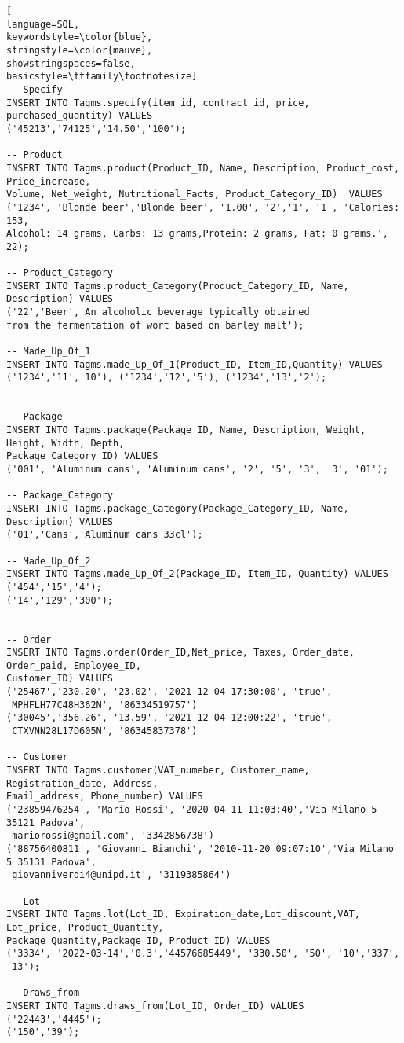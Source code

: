 \begin{lstlisting}[
language=SQL,
keywordstyle=\color{blue},
stringstyle=\color{mauve},
showstringspaces=false,
basicstyle=\ttfamily\footnotesize]
-- Specify
INSERT INTO Tagms.specify(item_id, contract_id, price, purchased_quantity) VALUES
('45213','74125','14.50','100');

-- Product
INSERT INTO Tagms.product(Product_ID, Name, Description, Product_cost, Price_increase,
Volume, Net_weight, Nutritional_Facts, Product_Category_ID)  VALUES 
('1234', 'Blonde beer','Blonde beer', '1.00', '2','1', '1', 'Calories: 153, 
Alcohol: 14 grams, Carbs: 13 grams,Protein: 2 grams, Fat: 0 grams.', 22);

-- Product_Category
INSERT INTO Tagms.product_Category(Product_Category_ID, Name, Description) VALUES 
('22','Beer','An alcoholic beverage typically obtained 
from the fermentation of wort based on barley malt');

-- Made_Up_Of_1
INSERT INTO Tagms.made_Up_Of_1(Product_ID, Item_ID,Quantity) VALUES
('1234','11','10'), ('1234','12','5'), ('1234','13','2');


-- Package
INSERT INTO Tagms.package(Package_ID, Name, Description, Weight, Height, Width, Depth, 
Package_Category_ID) VALUES
('001', 'Aluminum cans', 'Aluminum cans', '2', '5', '3', '3', '01');

-- Package_Category
INSERT INTO Tagms.package_Category(Package_Category_ID, Name, Description) VALUES 
('01','Cans','Aluminum cans 33cl');

-- Made_Up_Of_2
INSERT INTO Tagms.made_Up_Of_2(Package_ID, Item_ID, Quantity) VALUES
('454','15','4');
('14','129','300');


-- Order
INSERT INTO Tagms.order(Order_ID,Net_price, Taxes, Order_date, Order_paid, Employee_ID, 
Customer_ID) VALUES 
('25467','230.20', '23.02', '2021-12-04 17:30:00', 'true', 'MPHFLH77C48H362N', '86334519757')
('30045','356.26', '13.59', '2021-12-04 12:00:22', 'true', 'CTXVNN28L17D605N', '86345837378')

-- Customer
INSERT INTO Tagms.customer(VAT_numeber, Customer_name, Registration_date, Address, 
Email_address, Phone_number) VALUES
('23859476254', 'Mario Rossi', '2020-04-11 11:03:40','Via Milano 5 35121 Padova',
'mariorossi@gmail.com', '3342856738')
('88756400811', 'Giovanni Bianchi', '2010-11-20 09:07:10','Via Milano 5 35131 Padova',
'giovanniverdi4@unipd.it', '3119385864')

-- Lot
INSERT INTO Tagms.lot(Lot_ID, Expiration_date,Lot_discount,VAT, Lot_price, Product_Quantity, 
Package_Quantity,Package_ID, Product_ID) VALUES 
('3334', '2022-03-14','0.3','44576685449', '330.50', '50', '10','337', '13');

-- Draws_from
INSERT INTO Tagms.draws_from(Lot_ID, Order_ID) VALUES 
('22443','4445');
('150','39');

\end{lstlisting}